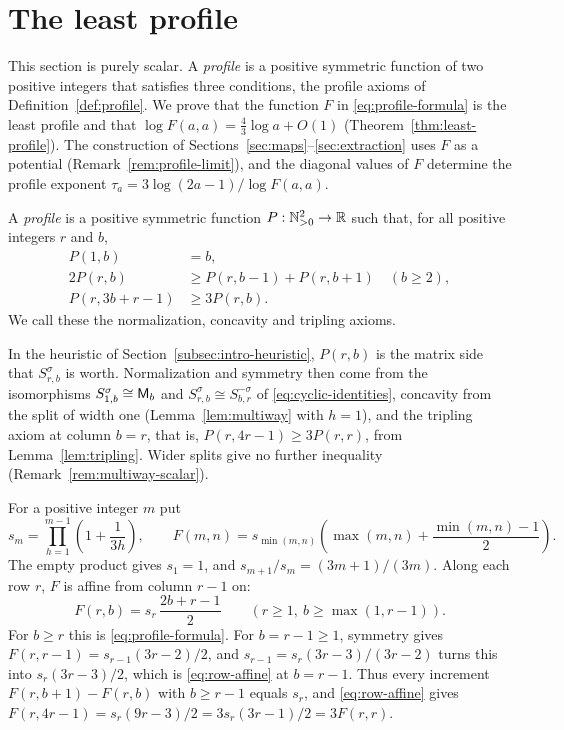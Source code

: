 \section{The least profile}
\label{sec:profile}

This section is purely scalar. A \emph{profile} is a positive symmetric
function of two positive integers that satisfies three conditions, the
profile axioms of Definition~\ref{def:profile}. We prove that the
function \(F\) in \eqref{eq:profile-formula} is the least profile and that
\(\log F(a,a)=\frac43\log a+O(1)\) (Theorem~\ref{thm:least-profile}).
The construction of Sections~\ref{sec:maps}--\ref{sec:extraction} uses
\(F\) as a potential (Remark~\ref{rem:profile-limit}), and the diagonal
values of \(F\) determine the profile exponent
\(\tau_a=3\log(2a-1)/\log F(a,a)\).

\begin{definition}\label{def:profile}
A \emph{profile} is a positive symmetric function
\(P:\mathbb N_{>0}^2\to\mathbb R\) such that, for all positive integers
\(r\) and \(b\),
\begin{align}
 P(1,b)&=b,\label{eq:normalization}\\
 2P(r,b)&\ge P(r,b-1)+P(r,b+1)\quad(b\ge2),\label{eq:concavity}\\
 P(r,3b+r-1)&\ge3P(r,b).\label{eq:tripling}
\end{align}
We call these the normalization, concavity and tripling axioms.
\end{definition}

In the heuristic of Section~\ref{subsec:intro-heuristic}, \(P(r,b)\) is
the matrix side that \(S^\sigma_{r,b}\) is worth. Normalization and
symmetry then come from the isomorphisms \(S^\sigma_{1,b}\cong\mathsf M_b\) and
\(S^\sigma_{r,b}\cong S^{-\sigma}_{b,r}\) of
\eqref{eq:cyclic-identities}, concavity from the split of width one
(Lemma~\ref{lem:multiway} with \(h=1\)), and the tripling axiom at column
\(b=r\), that is, \(P(r,4r-1)\ge3P(r,r)\), from
Lemma~\ref{lem:tripling}. Wider splits give no further inequality
(Remark~\ref{rem:multiway-scalar}).

For a positive integer \(m\) put
\begin{equation}\label{eq:profile-formula}
 s_m=\prod_{h=1}^{m-1}\left(1+\frac1{3h}\right),\qquad
 F(m,n)=s_{\min(m,n)}\left(\max(m,n)+\frac{\min(m,n)-1}{2}\right).
\end{equation}
The empty product gives \(s_1=1\), and \(s_{m+1}/s_m=(3m+1)/(3m)\).
Along each row \(r\), \(F\) is affine from column \(r-1\) on:
\begin{equation}\label{eq:row-affine}
 F(r,b)=s_r\,\frac{2b+r-1}{2}
 \qquad(r\ge1,\ b\ge\max(1,r-1)).
\end{equation}
For \(b\ge r\) this is \eqref{eq:profile-formula}. For \(b=r-1\ge1\),
symmetry gives \(F(r,r-1)=s_{r-1}(3r-2)/2\), and
\(s_{r-1}=s_r(3r-3)/(3r-2)\) turns this into \(s_r(3r-3)/2\), which is
\eqref{eq:row-affine} at \(b=r-1\). Thus every increment
\(F(r,b+1)-F(r,b)\) with \(b\ge r-1\) equals \(s_r\), and
\eqref{eq:row-affine} gives
\(F(r,4r-1)=s_r(9r-3)/2=3s_r(3r-1)/2=3F(r,r)\).

